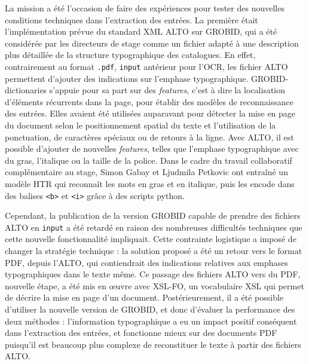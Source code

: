 \documentclass[a4paper,12pt,twoside]{book}
\begin{document}
La mission a été l'occasion de faire des expériences pour tester des nouvelles conditions techniques dans l'extraction des entrées. La première était l'implémentation prévue du standard XML ALTO sur GROBID, qui a été considérée par les directeurs de stage comme un fichier adapté à une description plus détaillée de la structure typographique des catalogues. En effet, contrairement au format \texttt{.pdf}, \texttt{input} antérieur pour l'OCR, les fichier ALTO permettent d'ajouter des indications sur l'emphase typographique. GROBID-dictionaries s’appuie  pour sa part sur des \textit{features}, c'est à dire la localisation d'éléments récurrents dans la page, pour établir des modèles de reconnaissance des entrées. Elles avaient été utilisées auparavant pour détecter la mise en page du document selon le positionnement spatial du texte et l'utilisation de la ponctuation, de caractères spéciaux ou de retours à la ligne. Avec ALTO, il est possible d'ajouter de nouvelles \textit{features}, telles que l'emphase typographique avec du gras, l'italique ou la taille de la police. Dans le cadre du travail collaboratif complémentaire au stage, Simon Gabay et Ljudmila Petkovic ont entraîné un modèle HTR qui reconnaît les mots en gras et en italique, puis les encode dans des balises \texttt{<b>} et \texttt{<i>} grâce à des scripts python.

Cependant, la publication de la version GROBID capable de prendre des fichiers ALTO en \texttt{input} a été retardé en raison des nombreuses difficultés techniques que cette nouvelle fonctionnalité impliquait. Cette contrainte logistique a imposé de changer la stratégie technique : la solution proposé a été un retour vers le format PDF, depuis l'ALTO, qui contiendrait des indications relatives aux emphases typographiques dans le texte même. Ce passage des fichiers ALTO vers du PDF, nouvelle étape, a été mis en œuvre avec XSL-FO, un vocabulaire XSL qui permet de décrire la mise en page d’un document. Postérieurement, il a été possible d'utiliser la nouvelle version de GROBID, et donc d'évaluer la performance des deux méthodes : l'information typographique a eu un impact positif conséquent dans l'extraction des entrées, et fonctionne mieux sur des documents PDF puisqu'il est beaucoup plus complexe de reconstituer le texte à partir des fichiers ALTO. 
\end{document}
